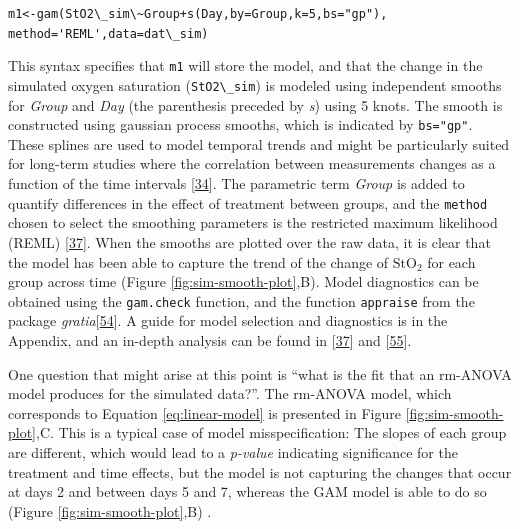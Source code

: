 \documentclass[
]{article}
\newcommand{\passthrough}[1]{#1}
\begin{document}
\passthrough{\lstinline!m1<-gam(StO2\_sim\~Group+s(Day,by=Group,k=5,bs="gp"), method='REML',data=dat\_sim)!}

This syntax specifies that \passthrough{\lstinline!m1!} will store the model, and that the change in the simulated oxygen saturation (\passthrough{\lstinline!StO2\_sim!}) is modeled using independent smooths for \emph{Group} and \emph{Day} (the parenthesis preceded by \emph{s}) using 5 knots. The smooth is constructed using gaussian process smooths, which is indicated by \passthrough{\lstinline!bs="gp"!}. These splines are used to model temporal trends and might be particularly suited for long-term studies where the correlation between measurements changes as a function of the time intervals {[}\protect\hyperlink{ref-simpson2018}{34}{]}. The parametric term \emph{Group} is added to quantify differences in the effect of treatment between groups, and the \passthrough{\lstinline!method!} chosen to select the smoothing parameters is the restricted maximum likelihood (REML) {[}\protect\hyperlink{ref-wood2017}{37}{]}. When the smooths are plotted over the raw data, it is clear that the model has been able to capture the trend of the change of \(\mbox{StO}_2\) for each group across time (Figure \ref{fig:sim-smooth-plot},B). Model diagnostics can be obtained using the \passthrough{\lstinline!gam.check!} function, and the function \passthrough{\lstinline!appraise!} from the package \emph{gratia}{[}\protect\hyperlink{ref-gratia}{54}{]}. A guide for model selection and diagnostics is in the Appendix, and an in-depth analysis can be found in {[}\protect\hyperlink{ref-wood2017}{37}{]} and {[}\protect\hyperlink{ref-harezlak2018}{55}{]}.

One question that might arise at this point is ``what is the fit that an rm-ANOVA model produces for the simulated data?''. The rm-ANOVA model, which corresponds to Equation \eqref{eq:linear-model} is presented in Figure \ref{fig:sim-smooth-plot},C. This is a typical case of model misspecification: The slopes of each group are different, which would lead to a \emph{p-value} indicating significance for the treatment and time effects, but the model is not capturing the changes that occur at days 2 and between days 5 and 7, whereas the GAM model is able to do so (Figure \ref{fig:sim-smooth-plot},B) .
\end{document}
